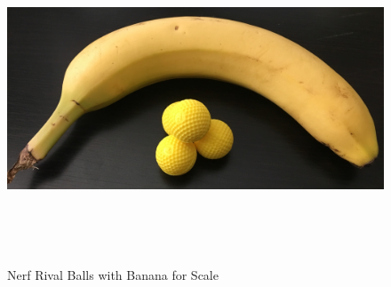 \begin{figure}[H]   %
	\centering \includegraphics[width=6in, height=3.85in, keepaspectratio]{figures/nerf_rival_balls.jpg}
	\caption{Nerf Rival Balls with Banana for Scale}	\label{fig:nerf_rival_balls}
\end{figure}

